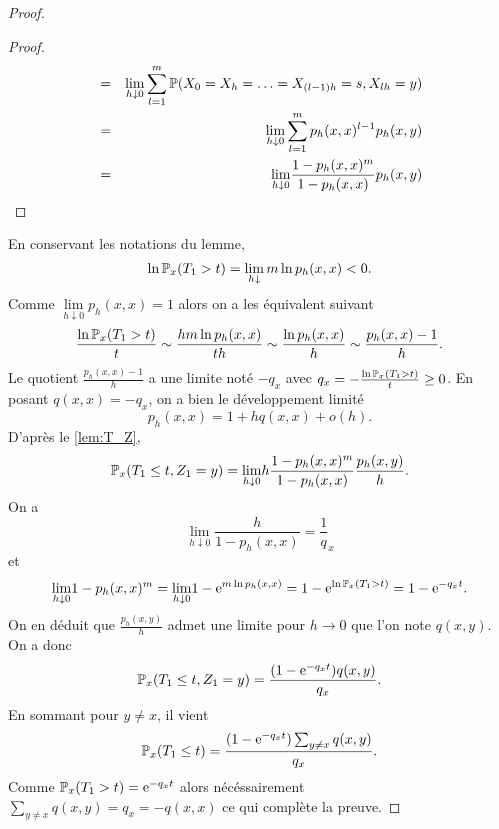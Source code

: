 \begin{proof}
\begin{proof}
\begin{eqnarray*}
&=&\underset{h\downarrow 0}{\lim}\sum_{l =1}^m \mathbb{P}(X_0 = X_h = \ldots= X_{(l-1)h} = s,X_{lh} = y)\\
&=&\underset{h\downarrow 0}{\lim}\sum_{l =1}^m p_h(x,x)^{l-1} p_h(x,y)\\
&=&\underset{h\downarrow 0}{\lim}\frac{1-p_h(x,x)^m}{1-p_h(x,x)} p_h(x,y)\\
\end{eqnarray*}
\end{proof}
En conservant les notations du lemme, 
$$
\ln \mathbb{P}_x(T_1>t) = \underset{h\downarrow}{\lim}\,m\ln p_h(x,x) <0.
$$
Comme $\underset{h\downarrow 0}{\lim} p_h(x,x) =1$ alors on a les équivalent suivant 
$$
\frac{\ln \mathbb{P}_x(T_1 > t )}{t}\sim \frac{hm\ln p_h(x,x)}{th}\sim \frac{\ln p_h(x,x)}{h}\sim \frac{p_h(x,x) - 1}{h}.
$$
Le quotient $\frac{p_h(x,x) - 1}{h}$ a une limite noté $- q_x$ avec $q_x = -\frac{\ln\mathbb{P}_x(T_1>t)}{t}\geq 0$. En posant $q(x,x)=-q_x$, on a bien le développement limité 
$$
p_h(x,x) = 1 + hq(x,x) + o(h).
$$
D'après le \cref{lem:T_Z},
$$
\mathbb{P}_x(T_1\leq t, Z_1 = y) = \underset{h\downarrow0}{\lim} h\frac{1-p_h(x,x)^m}{1-p_h(x,x)}\frac{p_h(x,y)}{h}.
$$
On a 
$$
\underset{h\downarrow0}{\lim} \frac{h}{1-p_h(x,x)} = \frac 1q_x
$$
et
$$
\underset{h\downarrow0}{\lim} 1-p_h(x,x)^m =\underset{h\downarrow0}{\lim} 1-\mathrm{e}^{m\ln p_h(x,x)} =1-\mathrm{e}^{\ln \mathbb{P}_x (T_1 >t)}=1-\mathrm{e}^{-q_x t}.
$$ 
On en déduit que $\frac{p_h(x,y)}{h}$ admet une limite pour $h\rightarrow 0$ que l'on note $q(x,y)$. On a donc
$$
\mathbb{P}_x(T_1\leq t, Z_1 = y) = \frac{(1-\mathrm{e}^{-q_x t})q(x,y)}{q_x}.
$$
En sommant pour $y\neq x$, il vient 
$$
\mathbb{P}_x(T_1\leq t) = \frac{(1-\mathrm{e}^{-q_x t})\sum_{y\neq x}q(x,y)}{q_x}.
$$
Comme $\mathbb{P}_x(T_1> t) = \mathrm{e}^{-q_x t }$ alors nécéssairement $\sum_{y\neq x}q(x,y)= q_x = -q(x,x)$ ce qui complète la preuve.
\end{proof}
